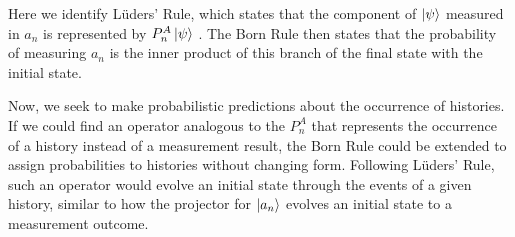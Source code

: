 Here we identify Lüders' Rule, which states that the component of $\ket{\psi}$ measured in $a_n$ is represented by $P^A_n \ket{\psi}$ \cite{Hegerfeldt}. The Born Rule then states that the probability of measuring $a_n$ is the inner product of this branch of the final state with the initial state.

Now, we seek to make probabilistic predictions about the occurrence of histories. If we could find an operator analogous to the $P^A_n$ that represents the occurrence of a history instead of a measurement result, the Born Rule could be extended to assign probabilities to histories without changing form. Following Lüders' Rule, such an operator would evolve an initial state through the events of a given history, similar to how the projector for $\ket{a_n}$ evolves an initial state to a measurement outcome.

